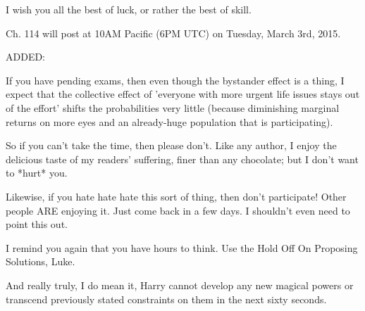 I wish you all the best of luck, or rather the best of skill.

Ch. 114 will post at 10AM Pacific (6PM UTC) on Tuesday, March 3rd, 2015.

\later

ADDED:

If you have pending exams,
then even though the bystander effect is a thing,
I expect that the collective effect of
'everyone with more urgent life issues stays out of the effort'
shifts the probabilities very little
(because diminishing marginal returns on more eyes
and an already-huge population that is participating).

So if you can't take the time, then please don't.
Like any author, I enjoy the delicious taste of my readers' suffering,
finer than any chocolate; but I don't want to *hurt* you.

Likewise, if you hate hate hate this sort of thing, then don't participate!
Other people ARE enjoying it. Just come back in a few days.
I shouldn't even need to point this out.

I remind you again that you have hours to think.
Use the Hold Off On Proposing Solutions, Luke.

And really truly, I do mean it,
Harry cannot develop any new magical powers
or transcend previously stated constraints on them
in the next sixty seconds.

